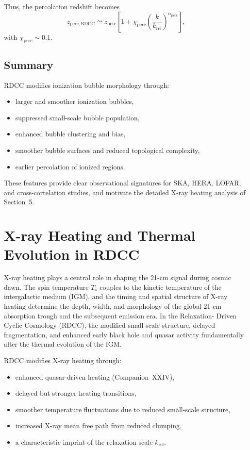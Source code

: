 \documentclass[11pt,a4paper]{article}
\begin{document}
Thus, the percolation redshift becomes
\begin{equation}
z_{\mathrm{perc,RDCC}}
\simeq
z_{\mathrm{perc}}
\left[
1
+
\chi_{\mathrm{perc}}
\left(
\frac{k}{k_{\mathrm{rel}}}
\right)^{\alpha_{\mathrm{perc}}}
\right],
\end{equation}
with $\chi_{\mathrm{perc}} \sim 0.1$.

\subsection{Summary}

RDCC modifies ionization bubble morphology through:
\begin{itemize}
\item larger and smoother ionization bubbles,
\item suppressed small-scale bubble population,
\item enhanced bubble clustering and bias,
\item smoother bubble surfaces and reduced topological complexity,
\item earlier percolation of ionized regions.
\end{itemize}

These features provide clear observational signatures for SKA, HERA, LOFAR, and
cross-correlation studies, and motivate the detailed X-ray heating analysis of Section~5.

\section{X-ray Heating and Thermal Evolution in RDCC}

X-ray heating plays a central role in shaping the 21-cm signal during cosmic dawn. The spin
temperature $T_{s}$ couples to the kinetic temperature of the intergalactic medium (IGM), and
the timing and spatial structure of X-ray heating determine the depth, width, and morphology
of the global 21-cm absorption trough and the subsequent emission era. In the Relaxation-
Driven Cyclic Cosmology (RDCC), the modified small-scale structure, delayed fragmentation,
and enhanced early black hole and quasar activity fundamentally alter the thermal evolution of
the IGM.

RDCC modifies X-ray heating through:
\begin{itemize}
\item enhanced quasar-driven heating (Companion~XXIV),
\item delayed but stronger heating transitions,
\item smoother temperature fluctuations due to reduced small-scale structure,
\item increased X-ray mean free path from reduced clumping,
\item a characteristic imprint of the relaxation scale $k_{\mathrm{rel}}$.
\end{itemize}
\end{document}
